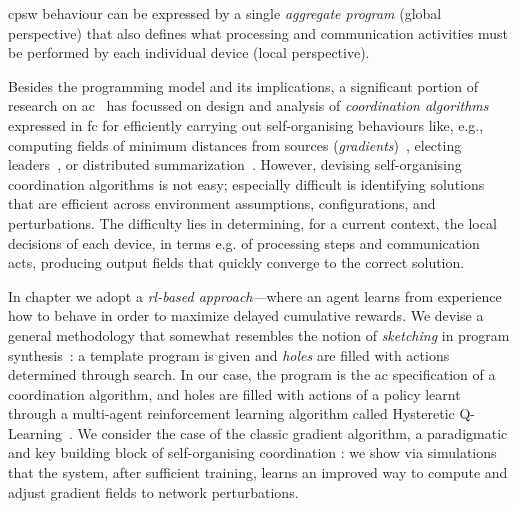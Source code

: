 \begin{comment}
In this work,
 we consider \emph{\ac{ac}}~\cite{DBLP:journals/computer/BealPV15}, a prominent \emph{field-based coordination} approach~\cite{DBLP:journals/jlap/ViroliBDACP19} 
promoting macro-programming 
 by capturing \ac{cas} behaviours 
 as functions operating on \emph{computational fields}~\cite{DBLP:journals/jlap/ViroliBDACP19},
 in a system model of neighbour-interacting devices
 operating in asynchronous sense-compute-interact rounds.
%
A computational field is a macro-abstraction
 that maps a set of devices over time to computational values.
%
\ac{ac} is based on the \emph{\ac{fc}}~\cite{DBLP:journals/jlap/ViroliBDACP19}, or variants thereof,
 that define constructs for manipulating and evolving fields.
%
\end{comment}
\ac{cpsw} behaviour
 can be expressed by a single \emph{aggregate program} (global perspective)
 that also defines 
 what processing and communication activities
 must be performed by each individual device (local perspective).

Besides the programming model and its implications,
 a significant portion of research on \ac{ac}~\cite{DBLP:journals/jlap/ViroliBDACP19} has focussed
 on design and analysis of \emph{coordination algorithms} expressed in \ac{fc}
 for efficiently carrying out self-organising behaviours
 like, e.g., computing fields of minimum distances from sources (\emph{gradients})~\cite{DBLP:conf/ipsn/NagpalSB03,DBLP:journals/pervasive/MameiZL04,DBLP:conf/saso/AudritoCDV17},
 electing leaders~\cite{DBLP:conf/saso/MoBD18},
 or %
 distributed summarization~\cite{DBLP:journals/cee/AudritoCDPV21}.
%
However, devising self-organising coordination algorithms is not easy; especially difficult is identifying solutions
 that are efficient across environment assumptions, configurations, and perturbations.
%
The difficulty lies in determining, 
 for a current context,
 the local decisions of each device, 
 in terms e.g. of processing steps and communication acts,
 producing output fields that quickly converge to the correct solution.

In chapter we adopt a \emph{\ac{rl}-based approach}---where an agent learns from experience
 how to behave in order to maximize delayed cumulative rewards.
%
We devise a general methodology that somewhat resembles the notion of \emph{sketching} in program synthesis~\cite{solar2008program-synthesis-sketching}:
 a template program is given and \emph{holes} are filled with actions determined through search.
%
In our case, the program is the \ac{ac} specification of a coordination algorithm, and holes are filled with actions of a policy learnt through a multi-agent reinforcement learning algorithm called Hysteretic Q-Learning~\cite{DBLP:conf/iros/MatignonLF07}.
%
We consider the case of the classic gradient algorithm, a paradigmatic and key building block of self-organising coordination \cite{DBLP:journals/jlap/ViroliBDACP19,beal2013organizing-aggregate,DBLP:journals/corr/abs-2201-03473}: we show via simulations 
 that the system, after sufficient training,
 learns an improved way to compute and adjust gradient fields to network perturbations.

